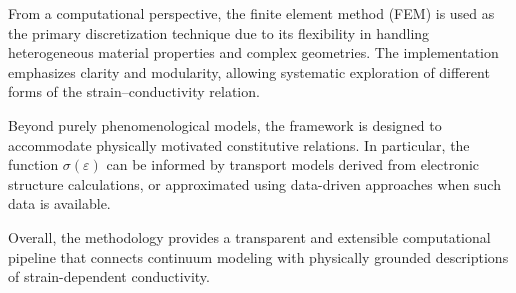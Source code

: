 From a computational perspective, the finite element method (FEM) is used as the primary discretization technique due to its flexibility 
in handling heterogeneous material properties and complex geometries. The implementation emphasizes clarity and modularity, allowing 
systematic exploration of different forms of the strain–conductivity relation.

Beyond purely phenomenological models, the framework is designed to accommodate physically motivated constitutive relations. 
In particular, the function $\sigma(\varepsilon)$ can be informed by transport models derived from electronic structure calculations, 
or approximated using data-driven approaches when such data is available.

Overall, the methodology provides a transparent and extensible computational pipeline that connects continuum modeling 
with physically grounded descriptions of strain-dependent conductivity.